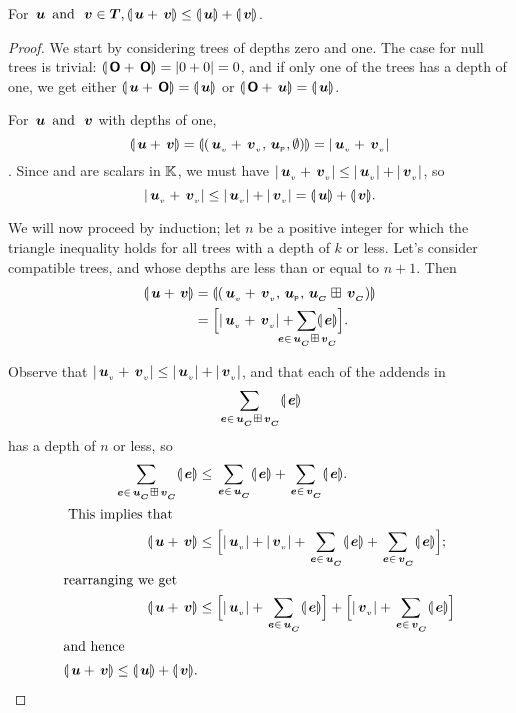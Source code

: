 \begin{proposition}\label{triangle1}
  For \(\node{u} \mand \node{v} \in \DOM, \nabs{\node{u} + \node{v}}
  \leq \nabs{\node{u}} + \nabs{\node{v}}\).

\begin{proof}
  We start by considering trees of depths zero and one. The case for null trees is trivial: \(\nabs{\zerotree +
    \zerotree} = \abs{0 + 0} = 0\), and if only one of the trees has a depth of one, we get either \(\nabs{\node{u} +
    \zerotree} = \nabs{\node{u}}\) or \(\nabs{\zerotree + \node{u}} = \nabs{\node{u}}\).

  For \(\node{u} \mand \node{v}\)  with depths of one, \[\nabs{\node{u} + \node{v}} = \nabs{(\nv{u}+\nv{v}, \nlabel{u}, \emptyset)}= \abs{\nv{u}+\nv{v}}\].
  Since  and  are scalars in $\FIELD$, we must have
  \(\abs{\nv{u} + \nv{v}} \leq \abs{\nv{u}}+\abs{\nv{v}}\),
  so \[\abs{\nv{u}+\nv{v}} \leq \abs{\nv{u}}+\abs{\nv{v}} = \nabs{\node{u}} + \nabs{\node{v}}.\]

  We will now proceed by induction; let \(n\) be a positive integer for which the triangle inequality holds for all
  trees with a depth of \(k\) or less.  Let's consider compatible trees,  and  whose depths are less
  than or equal to \(n+1\). Then
  \begin{align*}
      \nabs{\node{u} + \node{v}} &= \nabs{(\nv{u} + \nv{v}, \nlabel{u}, \child{u}\stplus\child{v})} \\
      &= \Bigl[\abs{\nv{u} + \nv{v}} + \mstsum{\node{e}\in{\child{u}\stplus\child{v}}}\nabs{\node{e}}\Bigr]. \\
  \end{align*}
  
  Observe that \(\abs{\nv{u} + \nv{v}} \leq \abs{\nv{u}} + \abs{\nv{v}}\), and that each 
  of the addends in \[\sum_{\node{e}\in{\child{u}\stplus\child{v}}}\nabs{\node{e}}\] has a depth of \(n\) or
  less, so 
\begin{align*}
  \sum_{\node{e}\in{\child{u}\stplus\child{v}}}\nabs{\node{e}} &\leq \sum_{\node{e}\in{\child{u}}}\nabs{\node{e}} + \sum_{\node{e}\in\child{v}}\nabs{\node{e}}.\\
  \intertext{ This implies that}
   \nabs{\node{u} + \node{v}} &\leq \Bigl[\abs{\nv{u}} + \abs{\nv{v}} + \sum_{\node{e}\in\child{u}}\nabs{\node{e}} + \sum_{\node{e}\in\child{v}}\nabs{\node{e}}\Bigr];\\
   \intertext{rearranging we get}
   \nabs{\node{u} + \node{v}}  &\leq \Bigl[\abs{\nv{u}} + \sum_{\node{e}\in\child{u}}\nabs{\node{e}}\Bigr] + \Bigl[\abs{\nv{v}} + \sum_{\node{e}\in\child{v}}\nabs{\node{e}}\Bigr] \\
   \intertext{and hence}
   \nabs{\node{u} + \node{v}} \leq \nabs{\node{u}}  + \nabs{\node{v}}.
\end{align*}
\end{proof}
\end{proposition}

